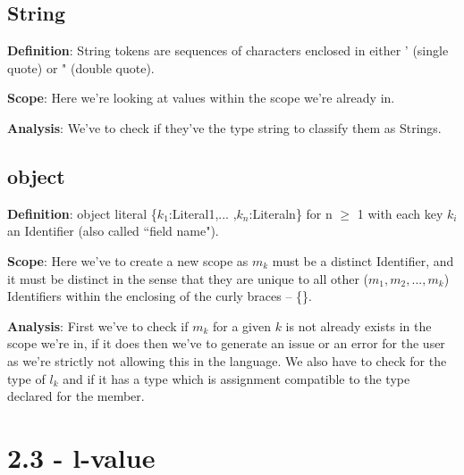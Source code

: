 \documentclass[11pt, oneside]{article}
\begin{document}
\subsection*{String}
\par \textbf{Definition}: String tokens are sequences of characters enclosed in either ' (single quote) or " (double quote).
\par \textbf{Scope}: Here we're looking at values within the scope we're already in.
\par \textbf{Analysis}: We've to check if they've the type string to classify them as Strings.

\subsection*{object}
\par \textbf{Definition}: object literal \{$k_1$:Literal1,... ,$k_n$:Literaln\} for n $\geq$ 1 with each key $k_i$ an Identifier (also called ``field name").
\par \textbf{Scope}: Here we've to create a new scope as $m_k$ must be a distinct Identifier, and it must be distinct in the sense that they are unique to all other ($m_1, m_2, ..., m_k$) Identifiers within the enclosing of the curly braces -- \{\}.
\par \textbf{Analysis}: First we've to check if $m_k$ for a given $k$ is not already exists in the scope we're in, if it does then we've to generate an issue or an error for the user as we're strictly not allowing this in the language. We also have to check for the type of $l_k$ and if it has a type which is assignment compatible to the type declared for the member.

\section*{2.3 - l-value}
\end{document}
